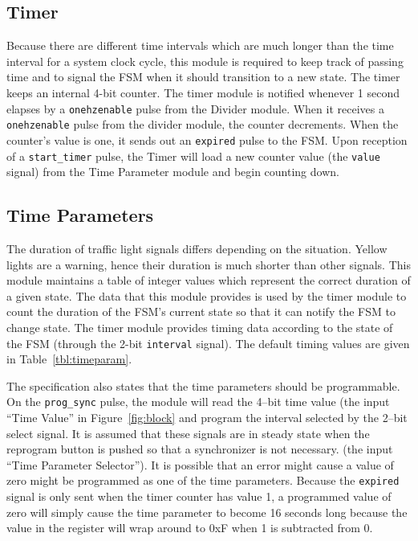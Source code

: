 \documentclass[12pt]{article}
\begin{document}
	\subsection{Timer}
	Because there are different time intervals which are much longer than
	the time interval for a system clock cycle, this module is required to
	keep track of passing time and to signal the FSM when it should transition
	to a new state.
	The timer keeps an internal 4-bit counter.  The timer module is notified
	whenever 1 second elapses by a \texttt{onehzenable} pulse from the Divider
	module.  When it receives a \texttt{onehzenable} pulse from the divider
	module, the counter decrements.  When the counter's value is one, it sends
	out an {\texttt{expired}} pulse to the FSM.  Upon reception of a
	\texttt{start\_timer}
	pulse, the Timer will load a new counter value (the \texttt{value}
	signal) from the Time Parameter module and begin counting down.

	\subsection{Time Parameters}
	The duration of traffic light signals differs depending on the situation.
	Yellow lights are a warning, hence their duration is much shorter than
	other signals.
	This module maintains a table of integer values which represent
	the correct duration of a given state.  The data that this module
	provides is used by the timer module to count the duration of the FSM's
	current state so that it can notify the FSM to change state.  The timer
	module provides timing data according to the state of the FSM (through
	the 2-bit \texttt{interval} signal).  The default timing values are
	given in Table~\ref{tbl:timeparam}.

	The specification also states that the time parameters should be
	programmable.  On the \texttt{prog\_sync} pulse, the module will read
	the 4--bit time value (the input ``Time Value'' in
	Figure~\ref{fig:block} and program the interval selected by the 2--bit
	select signal.  It is assumed that these signals are in steady
	state when the reprogram button is pushed so that a synchronizer is not
	necessary. (the input ``Time Parameter Selector'').  It is possible
	that an error might cause a value of zero might be programmed as one of
	the time parameters.  Because the \texttt{expired} signal is only sent
	when the timer counter has value 1, a programmed value of zero will
	simply cause the time parameter to become 16 seconds long because the
	value in the register will wrap around to 0xF when 1 is
	subtracted from 0.
\end{document}
